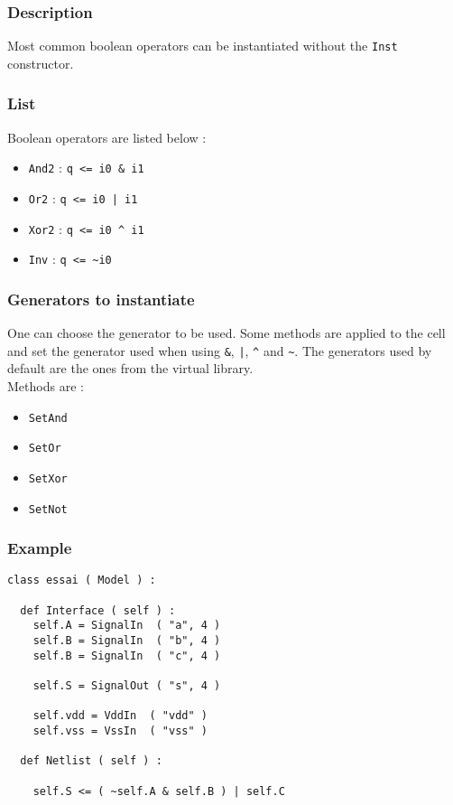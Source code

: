 \subsubsection{Description}

Most common boolean operators can be instantiated without the \verb-Inst- constructor.

\subsubsection{List}

Boolean operators are listed below :
\begin{itemize}
    \item \verb-And2- : \verb-q <= i0 & i1-
    \item \verb-Or2-  : \verb-q <= i0 | i1-
    \item \verb-Xor2- : \verb-q <= i0 ^ i1-
    \item \verb-Inv-  : \verb-q <= ~i0-
\end{itemize}


\subsubsection{Generators to instantiate}

One can choose the generator to be used. Some methods are applied to the cell and set the generator used when using \verb-&-, \verb-|-, \verb-^- and \verb-~-. The generators used by default are the ones from the virtual library.\\
        
\indent Methods are :
\begin{itemize}
    \item \verb-SetAnd-
    \item \verb-SetOr-
    \item \verb-SetXor-
    \item \verb-SetNot-
\end{itemize}

\subsubsection{Example}

\begin{verbatim}
class essai ( Model ) :

  def Interface ( self ) :
    self.A = SignalIn  ( "a", 4 )
    self.B = SignalIn  ( "b", 4 )
    self.B = SignalIn  ( "c", 4 )
    
    self.S = SignalOut ( "s", 4 )

    self.vdd = VddIn  ( "vdd" )
    self.vss = VssIn  ( "vss" )
	
  def Netlist ( self ) :

    self.S <= ( ~self.A & self.B ) | self.C
\end{verbatim}
  
